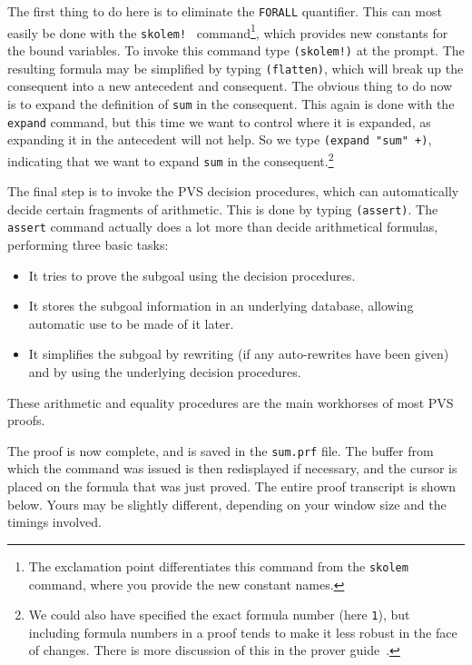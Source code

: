 The first thing to do here is to eliminate the \texttt{FORALL} quantifier.
This can most easily be done with the \texttt{skolem!}\   command\footnote{The exclamation point
differentiates this command from the \texttt{skolem} command, where you
provide the new constant names.}, which provides new constants for the
bound variables.  To invoke this command type \texttt{(skolem!)} at the
prompt.  The resulting formula may be simplified by typing
\texttt{(flatten)}, which
will break up the consequent into a new antecedent and consequent.  The
obvious thing to do now is to expand the definition of \texttt{sum} in the
consequent.  This again is done with the \texttt{expand} command, but this
time we want to control where it is expanded, as expanding it in the
antecedent will not help.  So we type \texttt{(expand "sum" +)},
indicating that we want to expand \texttt{sum} in the
consequent.\footnote{We could also have specified the exact formula number
(here \texttt{1}), but including formula numbers in a proof tends to make
it less robust in the face of changes.  There is more discussion of this
in the prover guide~\cite{PVS:prover}.}

The final step is to invoke the PVS decision procedures, which can
automatically decide certain fragments of arithmetic.  This is done by
typing \texttt{(assert)}. The \texttt{assert} command actually does a lot more than
decide arithmetical formulas, performing three basic tasks:
\begin{itemize}\def\itemsep{0in}
\item It tries to prove the subgoal using the decision procedures.

\item It stores the subgoal information in an underlying database,
allowing automatic use to be made of it later.

\item It simplifies the subgoal by rewriting (if any auto-rewrites have
been given) and by using the underlying decision procedures.
\end{itemize}
These arithmetic and equality procedures are the main workhorses of most
PVS proofs.

The proof is now complete, and is saved in the \texttt{sum.prf} file.  The
buffer from which the  command was issued is then redisplayed
if necessary, and the cursor is placed on the formula that was just
proved.  The entire proof transcript is shown below.  Yours may be
slightly different, depending on your window size and the timings involved.

